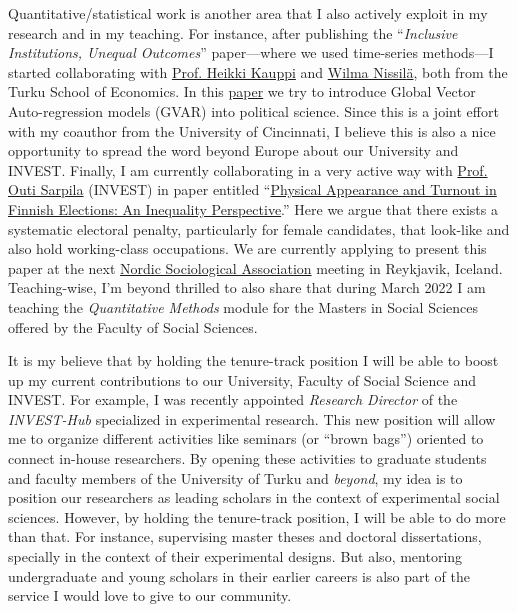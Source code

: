 \documentclass[10pt,stdletter,dateno,sigleft]{newlfm} %
\begin{document}
\begin{newlfm}
Quantitative/statistical work is another area that I also actively exploit in my research and in my teaching. For instance, after publishing the ``\emph{Inclusive Institutions, Unequal Outcomes}'' paper---where we used time-series methods---I started collaborating with \href{https://www.utu.fi/en/people/heikki-kauppi}{Prof. Heikki Kauppi} and \href{https://www.utu.fi/en/people/wilma-nissila}{Wilma Nissil{\"a}}, both from the Turku School of Economics. In this \href{https://github.com/hbahamonde/Bahamonde_Kovac/raw/master/abstract.txt}{paper} we try to introduce Global Vector Auto-regression models (GVAR) into political science. Since this is a joint effort with my coauthor from the University of Cincinnati, I believe this is also a nice opportunity to spread the word beyond Europe about our University and INVEST. Finally, I am currently collaborating in a very active way with \href{https://www.utu.fi/en/people/outi-sarpila}{Prof. Outi Sarpila} (INVEST) in paper entitled ``\href{https://raw.githubusercontent.com/hbahamonde/Physical/main/abstract.rtf}{Physical Appearance and Turnout in Finnish Elections: An Inequality Perspective}.'' Here we argue that there exists a systematic electoral penalty, particularly for female candidates, that look-like and also hold working-class occupations. We are currently applying to present this paper at the next \href{https://nsa2022.is}{Nordic Sociological Association} meeting in Reykjavik, Iceland. Teaching-wise, I'm beyond thrilled to also share that during March 2022 I am teaching the \emph{Quantitative Methods} module for the Masters in Social Sciences offered by the Faculty of Social Sciences. 

It is my believe that by holding the tenure-track position I will be able to boost up my current contributions to our University, Faculty of Social Science and INVEST. For example, I was recently appointed \emph{Research Director} of the \emph{INVEST-Hub} specialized in experimental research. This new position will allow me to organize different activities like seminars (or ``brown bags'') oriented to connect in-house researchers. By opening these activities to graduate students and faculty members of the University of Turku and \emph{beyond}, my idea is to position our researchers as leading scholars in the context of experimental social sciences. However, by holding the tenure-track position, I will be able to do more than that. For instance, supervising master theses and doctoral dissertations, specially in the context of their experimental designs. But also, mentoring undergraduate and young scholars in their earlier careers is also part of the service I would love to give to our community. 


\end{newlfm}
\end{document}
